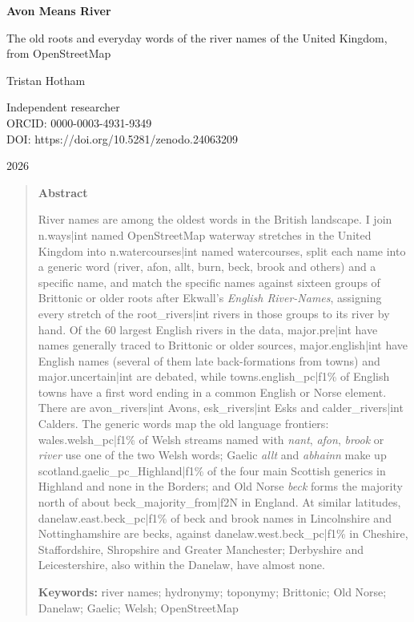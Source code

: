 \documentclass[11pt,a4paper]{article}
\begin{document}
\begin{center}
{\Large\bfseries Avon Means River\par}
\vspace{0.4em}
{\large The old roots and everyday words of the river names of the United Kingdom, from OpenStreetMap\par}
\vspace{1.2em}
{\large Tristan Hotham\par}
\vspace{0.3em}
{\small Independent researcher\\
ORCID: 0000-0003-4931-9349\\
DOI: https://doi.org/10.5281/zenodo.24063209\par}
\vspace{0.8em}
2026
\end{center}

\begin{quote}
\small
\begin{center}\textbf{Abstract}\end{center}
River names are among the oldest words in the British landscape. I join {{n.ways|int}} named OpenStreetMap waterway stretches in the United Kingdom into {{n.watercourses|int}} named watercourses, split each name into a generic word (river, afon, allt, burn, beck, brook and others) and a specific name, and match the specific names against sixteen groups of Brittonic or older roots after Ekwall's \textit{English River-Names}, assigning every stretch of the {{root_rivers|int}} rivers in those groups to its river by hand. Of the 60 largest English rivers in the data, {{major.pre|int}} have names generally traced to Brittonic or older sources, {{major.english|int}} have English names (several of them late back-formations from towns) and {{major.uncertain|int}} are debated, while {{towns.english_pc|f1}}\% of English towns have a first word ending in a common English or Norse element. There are {{avon_rivers|int}} Avons, {{esk_rivers|int}} Esks and {{calder_rivers|int}} Calders. The generic words map the old language frontiers: {{wales.welsh_pc|f1}}\% of Welsh streams named with \textit{nant}, \textit{afon}, \textit{brook} or \textit{river} use one of the two Welsh words; Gaelic \textit{allt} and \textit{abhainn} make up {{scotland.gaelic_pc_Highland|f1}}\% of the four main Scottish generics in Highland and none in the Borders; and Old Norse \textit{beck} forms the majority north of about {{beck_majority_from|f2}}\textdegree{}N in England. At similar latitudes, {{danelaw.east.beck_pc|f1}}\% of beck and brook names in Lincolnshire and Nottinghamshire are becks, against {{danelaw.west.beck_pc|f1}}\% in Cheshire, Staffordshire, Shropshire and Greater Manchester; Derbyshire and Leicestershire, also within the Danelaw, have almost none.

\textbf{Keywords:} river names; hydronymy; toponymy; Brittonic; Old Norse; Danelaw; Gaelic; Welsh; OpenStreetMap
\end{quote}
\end{document}
